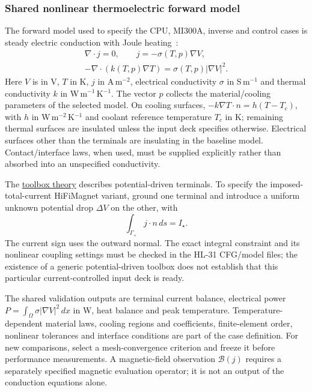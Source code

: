 \subsubsection{Shared nonlinear thermoelectric forward model}
\label{sec:app:feelpp:shared-thermoelectric}
The forward model used to specify the CPU, MI300A, inverse and control cases is
steady electric conduction with Joule heating~\cite{daver2016,Hild2020}:
\begin{gather}
 \nabla\cdot j=0,\qquad j=-\sigma(T,p)\nabla V,\label{eq:feelpp:hifi:electric}\\
 -\nabla\cdot(k(T,p)\nabla T)=\sigma(T,p)|\nabla V|^2.
 \label{eq:feelpp:hifi:heat}
\end{gather}
Here $V$ is in V, $T$ in K, $j$ in A\,m$^{-2}$, electrical conductivity
$\sigma$ in S\,m$^{-1}$ and thermal conductivity $k$ in
W\,m$^{-1}$\,K$^{-1}$. The vector $p$ collects the material/cooling parameters
of the selected model. On cooling surfaces,
$-k\nabla T\cdot n=h(T-T_c)$, with $h$ in W\,m$^{-2}$\,K$^{-1}$ and coolant
reference temperature $T_c$ in K; remaining thermal surfaces are insulated
unless the input deck specifies otherwise. Electrical surfaces other than the
terminals are insulating in the baseline model. Contact/interface laws, when
used, must be supplied explicitly rather than absorbed into an unspecified
conductivity.

The \href{https://docs.feelpp.org/toolboxes/latest/thermoelectric/theory.html}{toolbox theory}
describes potential-driven terminals. To specify the imposed-total-current
HiFiMagnet variant, ground one terminal and introduce a uniform unknown
potential drop $\Delta V$ on the other, with
\[
  \int_{\Gamma_+}j\cdot n\,ds=I_\star.
\]
The current sign uses the outward normal. The exact integral constraint and
its nonlinear coupling settings must be checked in the HL-31 CFG/model files;
the existence of a generic potential-driven toolbox does not establish that
this particular current-controlled input deck is ready.

The shared validation outputs are terminal current balance, electrical power
$P=\int_\Omega\sigma|\nabla V|^2\,dx$ in W, heat balance and peak temperature.
Temperature-dependent material laws, cooling regions and coefficients,
finite-element order, nonlinear tolerances and interface conditions are part
of the case definition. For new comparisons, select a mesh-convergence
criterion and freeze it before performance measurements. A magnetic-field
observation $\mathcal B(j)$ requires a separately specified magnetic evaluation
operator; it is not an output of the conduction equations alone.
